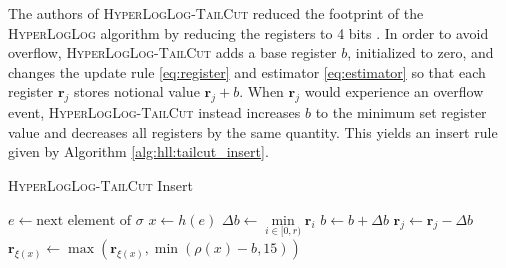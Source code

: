 \documentclass{report}
\newcommand{\algoname}[1]{\textnormal{\textsc{#1}}}
\begin{document}
The authors of \algoname{HyperLogLog-TailCut} reduced the footprint of the \algoname{HyperLogLog} algorithm by reducing the registers to 4 bits \cite{xiao2017better}.
In order to avoid overflow, \algoname{HyperLogLog-TailCut} adds a base register $b$, initialized to zero, and changes the update rule \eqref{eq:register} and estimator \eqref{eq:estimator} so that each register $\mathbf{r}_j$ stores notional value $\mathbf{r}_j + b$. 
When $\mathbf{r}_j$ would experience an overflow event, \algoname{HyperLogLog-TailCut} instead increases $b$ to the minimum set register value and decreases all registers by the same quantity. 
This yields an insert rule given by Algorithm \ref{alg:hll:tailcut_insert}.
\begin{algorithm}
\caption{\algoname{HyperLogLog-TailCut} Insert}\label{alg:hll:tailcut_insert}
\begin{algorithmic}[1]
	\State $e \gets \text{next element of $\sigma$}$
	\State $x \gets h(e)$
		\State $\Delta b \gets \min\limits_{i \in [0, r)} \mathbf{r}_i$
			\State $b \gets b + \Delta b$
			\For {$j \in [0,r)$}
				\State $\mathbf{r}_j \gets \mathbf{r}_j - \Delta b$
			\EndFor
		\EndIf
	\EndIf
	\State $\mathbf{r}_{\xi(x)} \gets \max ( \mathbf{r}_{\xi(x)}, \min ( \rho(x) - b, 15))$
\end{algorithmic}
\end{algorithm}
\end{document}
